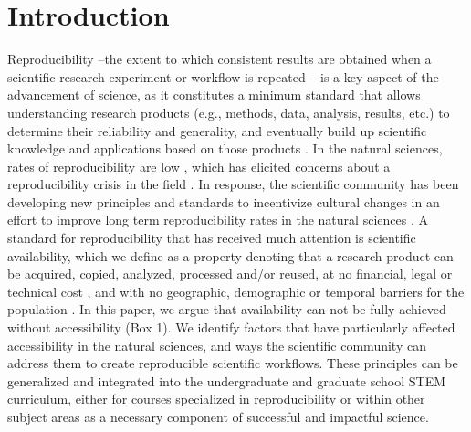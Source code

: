 \documentclass[12pt]{article}
\begin{document}
\newpage
{} %
\section*{Introduction}
\label{sec:intro}

Reproducibility --the extent to which consistent results are obtained when a scientific
research experiment or workflow is repeated \citep{repdef2021}--
is a key aspect of the advancement
of science, as it constitutes a minimum standard that allows understanding research products
(e.g., methods, data, analysis, results, etc.)
to determine their reliability and generality, and eventually build up scientific
knowledge and applications based on those products
\citep{king1995replication, peng2011reproducible, powers2019open}.
In the natural sciences, rates of reproducibility are low \citep{ioannidis2005most, prinz2011believe},
which has elicited concerns about a reproducibility crisis in the field \citep{baker2016reproducibility}.
In response, the scientific community has been developing new principles and standards to incentivize
cultural changes in an effort to improve long term reproducibility rates in the natural sciences
\citep{peng2015reproducibility, wilkinson2016fair}.
A standard for reproducibility that has received much attention is scientific availability, which
we define as a property denoting that a research product can be acquired, copied, analyzed,
processed and/or reused, at no financial, legal or technical cost \citep{arnold2019turing},
and with no geographic, demographic or temporal barriers for the population \citep{fecher2014open}.
In this paper, we argue that availability can not be fully achieved without accessibility (Box 1).
We identify factors that have particularly affected accessibility in
the natural sciences, and ways the scientific community can address them to create reproducible
scientific workflows. These principles can be generalized and integrated
into the undergraduate and graduate school STEM curriculum, either for courses specialized
in reproducibility or within other subject areas as a necessary component of
successful and impactful science.



\bigskip
\bigskip
\end{document}
